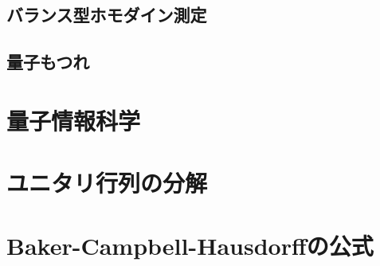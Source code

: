 \documentclass{report}
\begin{document}
    \section{バランス型ホモダイン測定}
    \section{量子もつれ}
  \chapter{量子情報科学}
  \appendix
  \chapter{ユニタリ行列の分解}\label{unitary-transform}
    
  \chapter{Baker-Campbell-Hausdorffの公式}
    
\end{document}
